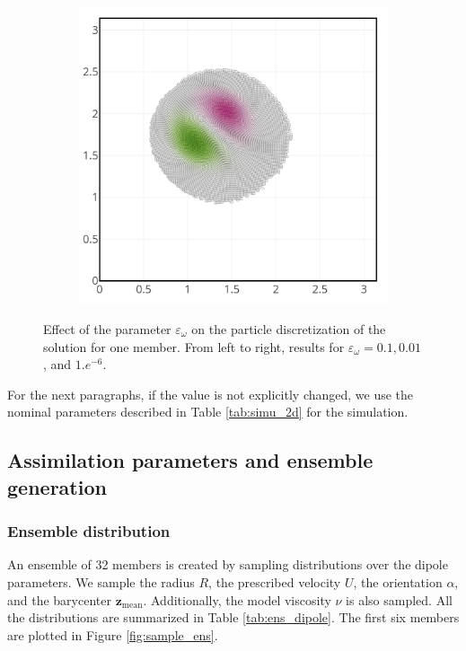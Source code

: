 \begin{figure}[htbp]
\begin{subfigure}{0.3\textwidth}
	\end{subfigure}
	\hfill
	\begin{subfigure}{0.3\textwidth}
		\includegraphics[width=\linewidth]{images/app2d/part_eps_1e-6.png}
	\end{subfigure}
	\caption{Effect of the parameter $\varepsilon_\omega$ on the particle discretization of the solution for one member. From left to right, results for $\varepsilon_\omega = 0.1, 0.01$, and $1.e^{-6}$.}
	\label{fig:eps_effect}
\end{figure}

For the next paragraphs, if the value is not explicitly changed, we use the nominal parameters described in Table \ref{tab:simu_2d} for the simulation.

\subsection{Assimilation parameters and ensemble generation}

\subsubsection{Ensemble distribution}
An ensemble of 32 members is created by sampling distributions over the dipole parameters. We sample the radius $R$, the prescribed velocity $U$, the orientation $\alpha$, and the barycenter $\bm z_{\text{mean}}$. Additionally, the model viscosity $\nu$ is also sampled. All the distributions are summarized in Table \ref{tab:ens_dipole}. The first six members are plotted in Figure \ref{fig:sample_ens}.

